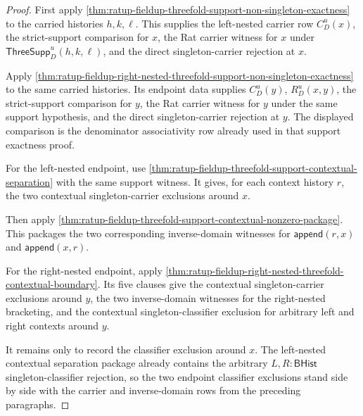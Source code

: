 \begin{proof}
First apply
\autoref{thm:ratup-fieldup-threefold-support-non-singleton-exactness} to the
carried histories $h,k,\ell$. This supplies the left-nested carrier row
$C_D^u(x)$, the strict-support comparison for $x$, the Rat carrier witness for
$x$ under $\mathsf{ThreeSupp}_D^u(h,k,\ell)$, and the direct singleton-carrier
rejection at $x$.

Apply
\autoref{thm:ratup-fieldup-right-nested-threefold-support-non-singleton-exactness}
to the same carried histories. Its endpoint data supplies $C_D^u(y)$,
$R_D^u(x,y)$, the strict-support comparison for $y$, the Rat carrier witness for
$y$ under the same support hypothesis, and the direct singleton-carrier
rejection at $y$. The displayed comparison is the denominator associativity row
already used in that support exactness proof.

For the left-nested endpoint, use
\autoref{thm:ratup-fieldup-threefold-support-contextual-separation} with the
same support witness. It gives, for each context history $r$, the two contextual
singleton-carrier exclusions around $x$.

Then apply
\autoref{thm:ratup-fieldup-threefold-support-contextual-nonzero-package}. This
packages the two corresponding inverse-domain witnesses for
$\mathsf{append}(r,x)$ and $\mathsf{append}(x,r)$.

For the right-nested endpoint, apply
\autoref{thm:ratup-fieldup-right-nested-threefold-contextual-boundary}. Its
five clauses give the contextual singleton-carrier exclusions around $y$, the
two inverse-domain witnesses for the right-nested bracketing, and the
contextual singleton-classifier exclusion for arbitrary left and right contexts
around $y$.

It remains only to record the classifier exclusion around $x$. The
left-nested contextual separation package already contains the arbitrary
$L,R:\mathsf{BHist}$ singleton-classifier rejection, so the two endpoint
classifier exclusions stand side by side with the carrier and inverse-domain
rows from the preceding paragraphs.
\end{proof}


